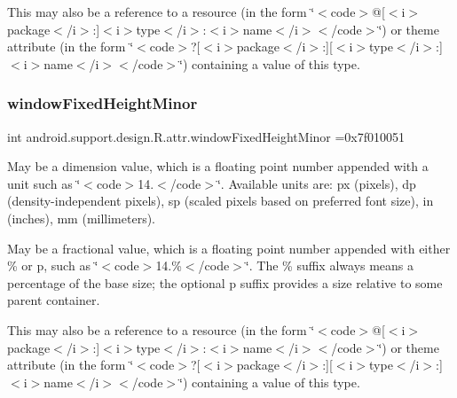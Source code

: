 This may also be a reference to a resource (in the form \char`\"{}$<$code$>$@\mbox{[}$<$i$>$package$<$/i$>$\+:\mbox{]}$<$i$>$type$<$/i$>$\+:$<$i$>$name$<$/i$>$$<$/code$>$\char`\"{}) or theme attribute (in the form \char`\"{}$<$code$>$?\mbox{[}$<$i$>$package$<$/i$>$\+:\mbox{]}\mbox{[}$<$i$>$type$<$/i$>$\+:\mbox{]}$<$i$>$name$<$/i$>$$<$/code$>$\char`\"{}) containing a value of this type. \mbox{\label{classandroid_1_1support_1_1design_1_1R_1_1attr_a0428452c793d06bca6f0778aad10a812}} 
\subsubsection{\texorpdfstring{window\+Fixed\+Height\+Minor}{windowFixedHeightMinor}}
{\footnotesize\ttfamily int android.\+support.\+design.\+R.\+attr.\+window\+Fixed\+Height\+Minor =0x7f010051\hspace{0.3cm}{\ttfamily [static]}}

May be a dimension value, which is a floating point number appended with a unit such as \char`\"{}$<$code$>$14.\+5sp$<$/code$>$\char`\"{}. Available units are\+: px (pixels), dp (density-\/independent pixels), sp (scaled pixels based on preferred font size), in (inches), mm (millimeters). 

May be a fractional value, which is a floating point number appended with either \% or p, such as \char`\"{}$<$code$>$14.\%$<$/code$>$\char`\"{}. The \% suffix always means a percentage of the base size; the optional p suffix provides a size relative to some parent container. 

This may also be a reference to a resource (in the form \char`\"{}$<$code$>$@\mbox{[}$<$i$>$package$<$/i$>$\+:\mbox{]}$<$i$>$type$<$/i$>$\+:$<$i$>$name$<$/i$>$$<$/code$>$\char`\"{}) or theme attribute (in the form \char`\"{}$<$code$>$?\mbox{[}$<$i$>$package$<$/i$>$\+:\mbox{]}\mbox{[}$<$i$>$type$<$/i$>$\+:\mbox{]}$<$i$>$name$<$/i$>$$<$/code$>$\char`\"{}) containing a value of this type. \mbox{\label{classandroid_1_1support_1_1design_1_1R_1_1attr_a1fcd76e231eda73c25225c029aa4ef39}} 
